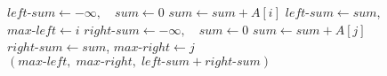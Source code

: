 \begin{algorithmic}
\State $left\text{-}sum \gets -\infty, \quad sum \gets 0$
  \State $sum \gets sum + A[i]$
    \State $left\text{-}sum \gets sum$, \quad $max\text{-}left \gets i$
  \EndIf
\EndFor
  \State $right\text{-}sum \gets -\infty, \quad sum \gets 0$
  \State $sum \gets sum + A[j]$
    \State $right\text{-}sum \gets sum$, \quad $max\text{-}right \gets j$
  \EndIf
\EndFor
\State \Return $(max\text{-}left,\;max\text{-}right,\;left\text{-}sum + right\text{-}sum)$
\EndFunction
\end{algorithmic}
